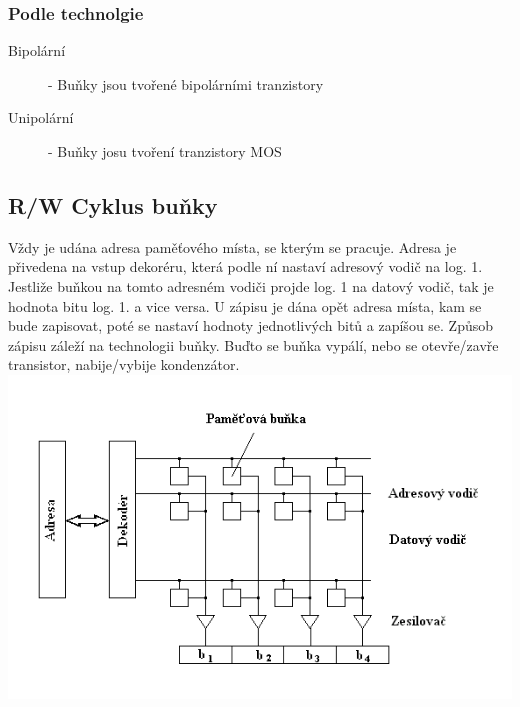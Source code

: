 \subsubsection{Podle technolgie}
\begin{description}
  \item[Bipolární] - Buňky jsou tvořené bipolárními tranzistory
  \item[Unipolární] - Buňky josu tvoření tranzistory MOS
\end{description}
\subsection{R/W Cyklus buňky}
Vždy je udána adresa paměťového místa, se kterým se pracuje.
Adresa je přivedena na vstup dekoréru, která podle ní nastaví adresový vodič na log. 1.
Jestliže buňkou na tomto adresném vodiči projde log. 1 na datový vodič, tak je hodnota bitu log. 1. a vice versa.
U zápisu je dána opět adresa místa, kam se bude zapisovat, poté se nastaví hodnoty jednotlivých bitů a zapíšou se.
Způsob zápisu záleží na technologii buňky.
Buďto se buňka vypálí, nebo se otevře/zavře transistor, nabije/vybije kondenzátor.\\
\includegraphics[width=\linewidth]{TVY-POS/Polovodicove-pameti/memorystructure.png}
